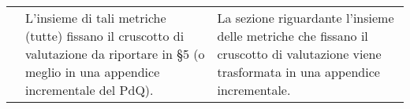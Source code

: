 {\begin{longtable}{ C{2cm} C{6cm} C{6cm}}
		\PdQ &  L’insieme di tali metriche (tutte) fissano il cruscotto di valutazione da riportare in §5 (o meglio in una appendice incrementale del PdQ). & La sezione riguardante l'insieme delle metriche che fissano il cruscotto di valutazione viene trasformata in una appendice incrementale.\\
		
	\end{longtable}
}

